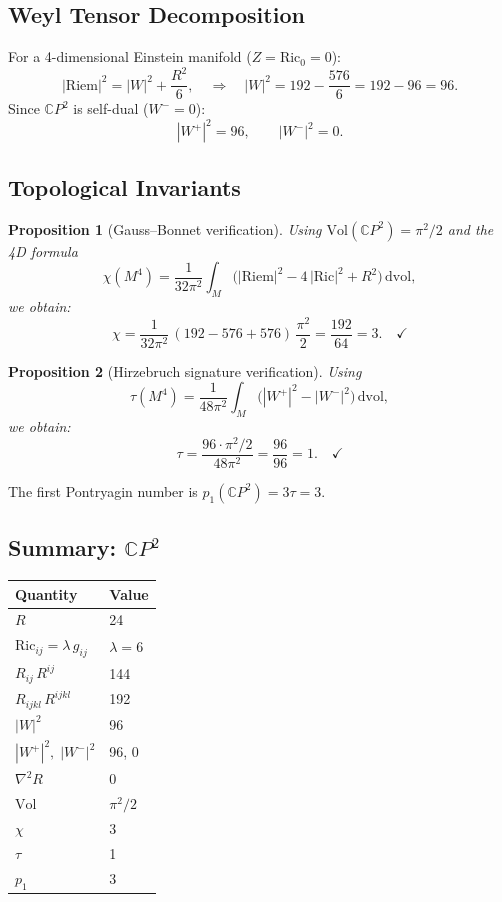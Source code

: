 \documentclass[11pt,a4paper]{article}
\newtheorem{proposition}{Proposition}
\begin{document}
\subsection{Weyl Tensor Decomposition}

For a 4-dimensional Einstein manifold ($Z = \mathrm{Ric}_0 = 0$):
\begin{equation}
|\mathrm{Riem}|^2 = |W|^2 + \frac{R^2}{6},
\quad\Longrightarrow\quad
|W|^2 = 192 - \frac{576}{6} = 192 - 96 = 96.
\end{equation}
Since $\mathbb{C}P^2$ is self-dual ($W^- = 0$):
\begin{equation}
|W^+|^2 = 96, \qquad |W^-|^2 = 0.
\end{equation}

\subsection{Topological Invariants}

\begin{proposition}[Gauss--Bonnet verification]
Using $\mathrm{Vol}(\mathbb{C}P^2) = \pi^2/2$ and the 4D formula
\[
\chi(M^4) = \frac{1}{32\pi^2}\int_M
\bigl(|\mathrm{Riem}|^2 - 4\,|\mathrm{Ric}|^2 + R^2\bigr)\,\mathrm{d}\mathrm{vol},
\]
we obtain:
\[
\chi = \frac{1}{32\pi^2}\,(192 - 576 + 576)\,\frac{\pi^2}{2}
     = \frac{192}{64} = 3. \quad\checkmark
\]
\end{proposition}

\begin{proposition}[Hirzebruch signature verification]
Using
\[
\tau(M^4) = \frac{1}{48\pi^2}\int_M
\bigl(|W^+|^2 - |W^-|^2\bigr)\,\mathrm{d}\mathrm{vol},
\]
we obtain:
\[
\tau = \frac{96 \cdot \pi^2/2}{48\pi^2} = \frac{96}{96} = 1. \quad\checkmark
\]
\end{proposition}

\noindent
The first Pontryagin number is $p_1(\mathbb{C}P^2) = 3\tau = 3$.

\subsection{Summary: $\mathbb{C}P^2$}

\begin{center}
\begin{tabular}{ll}
\toprule
Quantity & Value \\
\midrule
$R$ & 24 \\
$\mathrm{Ric}_{ij} = \lambda\,g_{ij}$ & $\lambda = 6$ \\
$R_{ij}\,R^{ij}$ & 144 \\
$R_{ijkl}\,R^{ijkl}$ & 192 \\
$|W|^2$ & 96 \\
$|W^+|^2,\; |W^-|^2$ & 96, 0 \\
$\nabla^2 R$ & 0 \\
$\mathrm{Vol}$ & $\pi^2/2$ \\
$\chi$ & 3 \\
$\tau$ & 1 \\
$p_1$ & 3 \\
\bottomrule
\end{tabular}
\end{center}
\end{document}
